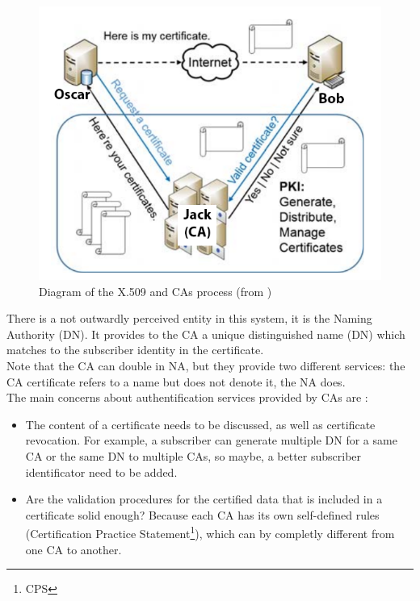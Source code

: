 \documentclass[journal, a4paper]{IEEEtran}
\begin{document}
\begin{figure}[!h]
	\begin{center}
		\includegraphics[scale=0.45]{pki.png}
		\caption{Diagram of the X.509 and CAs process (from \cite{wang2015domain})}
		\label{fig:pki}
	\end{center}
\end{figure}

There is a not outwardly perceived entity in this system, it is the Naming Authority (DN). It provides to the CA a unique distinguished name (DN) which matches to the subscriber identity in the certificate.\\
Note that the CA can double in NA, but they provide two different services: the CA certificate refers to a name but does not denote it, the NA does.\\

The main concerns about authentification services provided by CAs are :

\begin{itemize}
	\item The content of a certificate needs to be discussed, as well as certificate revocation. For example, a subscriber can generate multiple DN for a same CA or the same DN to multiple CAs, so maybe, a better subscriber identificator need to be added.
	\item Are the validation procedures for the certified data that is included in a certificate solid enough? Because each CA has its own self-defined rules (Certification Practice Statement\footnote{CPS}), which can by completly different from one CA to another.
\end{itemize}
\end{document}
